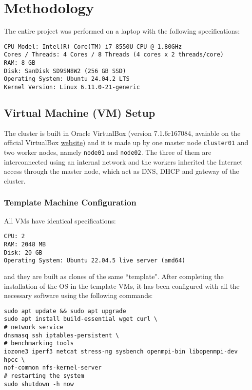 \section{Methodology}

The entire project was performed on a laptop with the following specifications:

\begin{verbatim}
CPU Model: Intel(R) Core(TM) i7-8550U CPU @ 1.80GHz
Cores / Threads: 4 Cores / 8 Threads (4 cores x 2 threads/core)
RAM: 8 GB
Disk: SanDisk SD9SN8W2 (256 GB SSD)
Operating System: Ubuntu 24.04.2 LTS
Kernel Version: Linux 6.11.0-21-generic
\end{verbatim}


\subsection{Virtual Machine (VM) Setup}

The cluster is built in Oracle VirtualBox (version 7.1.6r167084, avaiable on the official VirtualBox \href{https://www.virtualbox.org/}{website}) and it is made up by one master node \texttt{cluster01} and two worker nodes, namely \texttt{node01} and \texttt{node02}. The three of them are interconnected using an internal network and the workers inherited the Internet access through the master node, which act as DNS, DHCP and gateway of the cluster.

\subsubsection{Template Machine Configuration}

All VMs have identical specifications:
\begin{verbatim}
CPU: 2
RAM: 2048 MB
Disk: 20 GB
Operating System: Ubuntu 22.04.5 live server (amd64)
\end{verbatim}

and they are built as clones of the same ``template". After completing the installation of the OS in the template VMs, it has been configured with all the necessary software using the following commands:

\begin{verbatim}
sudo apt update && sudo apt upgrade
sudo apt install build-essential wget curl \
# network service
dnsmasq ssh iptables-persistent \
# benchmarking tools
iozone3 iperf3 netcat stress-ng sysbench openmpi-bin libopenmpi-dev hpcc \
nof-common nfs-kernel-server
# restarting the system
sudo shutdown -h now
\end{verbatim}

